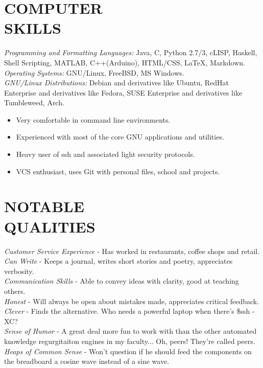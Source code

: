 \documentclass[margin]{res}
\begin{document}
\begin{resume}
\section{COMPUTER \\ SKILLS} {\sl Programming and Formatting Languages:} Java, C, Python 2.7/3, 
                cLISP, Haskell, Shell Scripting, MATLAB, C++(Arduino), HTML/CSS, LaTeX, Markdown.\\
                {\sl Operating Systems:} GNU/Linux, FreeBSD, MS Windows. \\
                 {\sl GNU/Linux Distributions:} Debian and derivatives like Ubuntu, RedHat Enterprise and derivatives like Fedora, SUSE Enterprise and derivatives like Tumbleweed, Arch.
                 \begin{itemize}  \itemsep -2pt %
                 \item Very comfortable in command line environments. 
                \item  Experienced with most of the core GNU applications and utilities.
                \item Heavy user of ssh and associated light security protocols.
                \item VCS enthusiast, uses Git with personal files, school and projects.
\end{itemize}

\section{NOTABLE \\ QUALITIES} 



{\sl Customer Service Experience} - Has worked in restaurants, coffee shops and retail.\\
{\sl Can Write} - Keeps a journal, writes short stories and poetry, appreciates verbosity.\\{\sl Communication Skills} - Able to convey ideas with clarity, good at teaching others.\\
{\sl Honest} - Will always be open about mistakes made, appreciates critical feedback.\\
{\sl Clever} - Finds the alternative. Who needs a powerful laptop when there's \$ssh -XC?\\
{\sl Sense of Humor} - A great deal more fun to work with than the other automated knowledge regurgitaiton engines in my faculty... Oh, peers! They're called peers. \\
{\sl Heaps of Common Sense} - Won't question if he should feed the components on the breadboard a cosine wave instead of a sine wave.


\end{resume}
\end{document}
